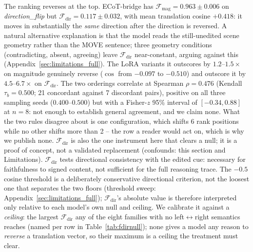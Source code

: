 \documentclass{article}
\begin{document}
The ranking reverses at the top. ECoT-bridge has $\mathcal{F}_{\text{mag}} = 0.963 \pm 0.006$ on \emph{direction\_flip} but $\mathcal{F}_{\text{dir}} = 0.117 \pm 0.032$, with mean translation cosine $+0.418$: it moves in substantially the \emph{same} direction after the direction is reversed. A natural alternative explanation is that the model reads the still-unedited scene geometry rather than the MOVE sentence; three geometry conditions (contradicting, absent, agreeing) leave $\mathcal{F}_{\text{dir}}$ near-constant, arguing against this (Appendix~\ref{sec:limitations_full}). The LoRA variants it outscores by $1.2$--$1.5\times$ on magnitude genuinely reverse ($\cos$ from $-0.097$ to $-0.510$) and outscore it by $4.5$--$6.7\times$ on $\mathcal{F}_{\text{dir}}$.
The two orderings correlate at Spearman $\rho = 0.476$ (Kendall $\tau_b = 0.500$; 21 concordant against 7 discordant pairs), positive on all three sampling seeds ($0.400$--$0.500$) but with a Fisher-$z$ 95\% interval of $[-0.34, 0.88]$ at $n{=}8$: not enough to establish general agreement, and we claim none. What the two rules disagree about is one configuration, which shifts 6 rank positions while no other shifts more than 2 -- the row a reader would act on, which is why we publish none.
$\mathcal{F}_{\text{dir}}$ is also the one instrument here that clears a null; it is a proof of concept, not a validated replacement (confounds: this section and Limitations). $\mathcal{F}_{\text{dir}}$ tests directional consistency with the edited cue: necessary for faithfulness to signed content, not sufficient for the full reasoning trace. The $-0.5$ cosine threshold is a deliberately conservative directional criterion, not the loosest one that separates the two floors (threshold sweep: Appendix~\ref{sec:limitations_full}); $\mathcal{F}_{\text{dir}}$'s absolute value is therefore interpreted only relative to each model's own null and ceiling. We calibrate it against a \emph{ceiling}: the largest $\mathcal{F}_{\text{dir}}$ any of the eight families with no left$\leftrightarrow$right semantics reaches (named per row in Table~\ref{tab:fdirnull}); none gives a model any reason to \emph{reverse} a translation vector, so their maximum is a ceiling the treatment must clear.
\end{document}
